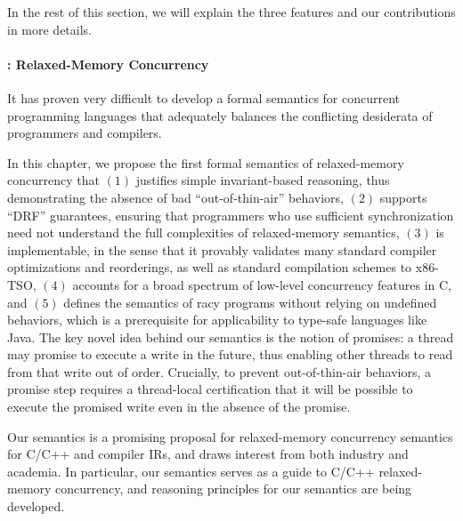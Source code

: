 In the rest of this section, we will explain the three features and our contributions in more
details.



\paragraph{: Relaxed-Memory Concurrency}

 It has proven very difficult to develop a
formal semantics for concurrent programming languages that adequately balances the conflicting
desiderata of programmers and compilers.

In this chapter, we propose the first formal semantics of relaxed-memory concurrency that $(1)$
justifies simple invariant-based reasoning, thus demonstrating the absence of bad
``out-of-thin-air'' behaviors, $(2)$ supports ``DRF'' guarantees, ensuring that programmers who use
sufficient synchronization need not understand the full complexities of relaxed-memory semantics,
$(3)$ is implementable, in the sense that it provably validates many standard compiler optimizations
and reorderings, as well as standard compilation schemes to x86-TSO, $(4)$ accounts for a broad
spectrum of low-level concurrency features in C, and $(5)$ defines the semantics of racy programs
without relying on undefined behaviors, which is a prerequisite for applicability to type-safe
languages like Java.  The key novel idea behind our semantics is the notion of promises: a thread
may promise to execute a write in the future, thus enabling other threads to read from that write
out of order.  Crucially, to prevent out-of-thin-air behaviors, a promise step requires a
thread-local certification that it will be possible to execute the promised write even in the
absence of the promise.

  Our semantics is a promising proposal for relaxed-memory concurrency
semantics for C/C++ and compiler IRs, and draws interest from both industry and academia.  In
particular, our semantics serves as a guide to C/C++ relaxed-memory concurrency, and reasoning
principles for our semantics are being developed.

